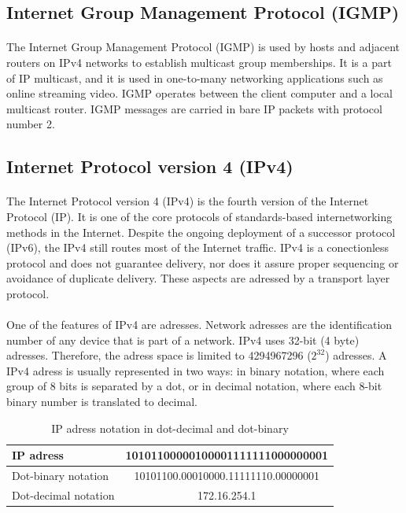 \documentclass[12pt,a4paper]{report}
\begin{document}
\subsection{Internet Group Management Protocol (IGMP)}
\paragraph{}The Internet Group Management Protocol (IGMP) is used by hosts and adjacent routers on IPv4 networks to establish multicast group memberships. It is a part of IP multicast, and it is used in one-to-many networking applications such as online streaming video. IGMP operates between the client computer and a local multicast router. IGMP messages are carried in bare IP packets with protocol number 2.

\subsection{Internet Protocol version 4 (IPv4)}
\paragraph{}The Internet Protocol version 4 (IPv4) is the fourth version of the Internet Protocol (IP). It is one of the core protocols of standards-based internetworking methods in the Internet. Despite the ongoing deployment of a successor protocol (IPv6), the IPv4 still routes most of the Internet traffic. IPv4 is a conectionless protocol and does not guarantee delivery, nor does it assure proper sequencing or avoidance of duplicate delivery. These aspects are adressed by a transport layer protocol.
\paragraph{}One of the features of IPv4 are adresses. Network adresses are the identification number of any device that is part of a network. IPv4 uses 32-bit (4 byte) adresses. Therefore, the adress space is limited to 4294967296 ($2^{32}$) adresses. A IPv4 adress is usually represented in two ways: in binary notation, where each group of 8 bits is separated by a dot, or in decimal notation, where each 8-bit binary number is translated to decimal.
\begin{table}[H]
\begin{center}
\begin{tabular}{|l|c|}
\hline 
IP adress & 10101100000100001111111000000001 \\ 
\hline 
Dot-binary notation & 10101100.00010000.11111110.00000001 \\ 
\hline 
Dot-decimal notation & 172.16.254.1 \\ 
\hline 
\end{tabular}
\end{center}
\caption[IP adress notation]{IP adress notation in dot-decimal and dot-binary}
\end{table}
\end{document}
